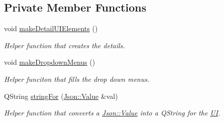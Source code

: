 \subsection*{Private Member Functions}
\begin{DoxyCompactItemize}
\item 
\hypertarget{class_u_i_1_1_info_pane_afa40d52eb9bc349dc1ac3f33c97642fe}{void \hyperlink{class_u_i_1_1_info_pane_afa40d52eb9bc349dc1ac3f33c97642fe}{make\-Detail\-U\-I\-Elements} ()}\label{class_u_i_1_1_info_pane_afa40d52eb9bc349dc1ac3f33c97642fe}

\begin{DoxyCompactList}\small\item\em Helper function that creates the details. \end{DoxyCompactList}\item 
\hypertarget{class_u_i_1_1_info_pane_a839d41c9cb20dc8b553fdc2a47a15b83}{void \hyperlink{class_u_i_1_1_info_pane_a839d41c9cb20dc8b553fdc2a47a15b83}{make\-Dropdown\-Menus} ()}\label{class_u_i_1_1_info_pane_a839d41c9cb20dc8b553fdc2a47a15b83}

\begin{DoxyCompactList}\small\item\em Helper funciton that fills the drop down menus. \end{DoxyCompactList}\item 
Q\-String \hyperlink{class_u_i_1_1_info_pane_a8f9678a15d198893017f3f28af00be13}{string\-For} (\hyperlink{class_json_1_1_value}{Json\-::\-Value} \&val)
\begin{DoxyCompactList}\small\item\em Helper function that converts a \hyperlink{class_json_1_1_value}{Json\-::\-Value} into a {\ttfamily Q\-String} for the \hyperlink{namespace_u_i}{U\-I}. \end{DoxyCompactList}\end{DoxyCompactItemize}

